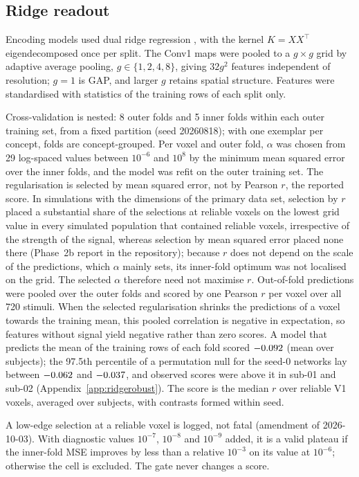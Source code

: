 \documentclass[10pt]{article}
\begin{document}
\subsection{Ridge readout}
\label{sec:ridge}

Encoding models used dual ridge regression \citep{hoerl1970}, with the kernel
$K = XX^{\top}$ eigendecomposed once per split. The Conv1 maps were
pooled to a $g \times g$ grid by adaptive average pooling, $g \in \{1, 2, 4, 8\}$, giving
$32g^2$ features independent of resolution; $g = 1$ is GAP, and larger $g$ retains
spatial structure. Features were standardised with statistics of the training rows of
each split only.

Cross-validation is nested: 8 outer folds and 5 inner folds within each outer training
set, from a fixed partition (seed 20260818); with one exemplar per concept, folds are
concept-grouped. Per voxel and outer fold, $\alpha$ was
chosen from 29 log-spaced values between $10^{-6}$ and $10^{8}$ by the minimum mean
squared error over the inner folds, and the model was refit on the outer training set.
The regularisation is selected by mean squared error, not by Pearson $r$, the reported score. In simulations with the dimensions of the primary data set, selection by $r$ placed a substantial share of the selections at reliable voxels on the lowest grid value in every simulated population that contained reliable voxels, irrespective of the strength of the signal, whereas selection by mean squared error placed none there (Phase~2b report in the repository); because $r$ does not depend on the scale of the predictions, which $\alpha$ mainly sets, its inner-fold optimum was not localised on the grid. The selected $\alpha$ therefore need not maximise $r$.
Out-of-fold predictions were pooled over the outer folds and scored by one Pearson $r$
per voxel over all 720 stimuli. When the selected regularisation shrinks the predictions
of a voxel towards the training mean, this pooled correlation is negative in
expectation, so features without signal yield negative rather than zero scores. A model that predicts the mean of the training rows of each fold scored $-0.092$ (mean over subjects); the 97.5th percentile of a permutation null for the seed-0 networks lay between $-0.062$ and $-0.037$, and observed scores were above it in sub-01 and sub-02 (Appendix~\ref{app:ridgerobust}). The score is the median $r$ over reliable V1 voxels,
averaged over subjects, with contrasts formed within seed.

A low-edge selection at a reliable voxel is logged, not fatal (amendment of 2026-10-03).
With diagnostic values $10^{-7}$, $10^{-8}$ and $10^{-9}$
added, it is a valid plateau if the inner-fold MSE improves by less than a relative
$10^{-3}$ on its value at $10^{-6}$; otherwise the cell is excluded. The gate never
changes a score.
\end{document}
